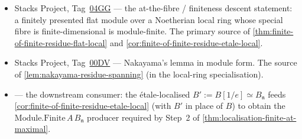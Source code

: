 \begin{itemize}
\item Stacks Project, Tag~\href{https://stacks.math.columbia.edu/tag/04GG}{04GG} —
  the at-the-fibre / finiteness descent statement: a finitely
  presented flat module over a Noetherian local ring whose special
  fibre is finite-dimensional is module-finite. The primary source
  of \cref{thm:finite-of-finite-residue-flat-local} and
  \cref{cor:finite-of-finite-residue-etale-local}.
\item Stacks Project, Tag~\href{https://stacks.math.columbia.edu/tag/00DV}{00DV} —
  Nakayama's lemma in module form. The source of
  \cref{lem:nakayama-residue-spanning} (in the local-ring
  specialisation).
\item {}
  — the downstream consumer: the étale-localised
  \(B' := B[1/e] \simeq B_{\mathfrak n}\) feeds
  \cref{cor:finite-of-finite-residue-etale-local} (with \(B'\) in
  place of \(B\)) to obtain the
  \(\mathrm{Module.Finite}\,A\,B_{\mathfrak n}\) producer required
  by Step~2 of \cref{thm:localisation-finite-at-maximal}.
\end{itemize}
